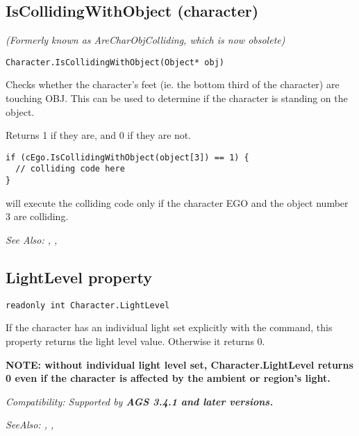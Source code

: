 \subsection{IsCollidingWithObject (character)}\label{Character.IsCollidingWithObject}%

\it{(Formerly known as AreCharObjColliding, which is now obsolete)}

\begin{verbatim}
Character.IsCollidingWithObject(Object* obj)
\end{verbatim}
Checks whether the character's feet (ie. the bottom third of the character) are
touching OBJ. This can be used to determine if the character is standing on the object.

Returns 1 if they are, and 0 if they are not.

\begin{verbatim}
if (cEgo.IsCollidingWithObject(object[3]) == 1) {
  // colliding code here
}
\end{verbatim}
will execute the colliding code only if the character EGO and the object number 3 are colliding.

\it{See Also:} ,
,


\subsection{LightLevel property}\label{Character.LightLevel}%

\begin{verbatim}
readonly int Character.LightLevel
\end{verbatim}
If the character has an individual light set explicitly with the
 command, this property returns the light level value.
Otherwise it returns 0.

\bf{NOTE:} without individual light level set, Character.LightLevel returns 0 even if the character is affected by the ambient or region's light.

\it{Compatibility:} Supported by \bf{AGS 3.4.1} and later versions.

\it{SeeAlso:} ,
,


